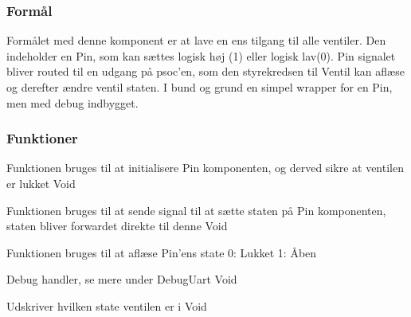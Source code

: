 \subsubsection{Formål}
Formålet med denne komponent er at lave en ens 
tilgang til alle ventiler. Den indeholder en Pin, 
som kan sættes logisk høj (1) eller logisk lav(0). 
Pin signalet bliver routed til en udgang på psoc'en, 
som den styrekredsen til Ventil kan aflæse og derefter 
ændre ventil staten. I bund og grund en simpel wrapper 
for en Pin, men med debug indbygget.

\subsubsection{Funktioner}

{Funktionen bruges til at initialisere Pin komponenten, og derved sikre at ventilen er lukket}
{Void}
{}

{Funktionen bruges til at sende signal til at sætte staten på Pin komponenten, staten bliver forwardet direkte til denne}
{Void}
{
}

{Funktionen bruges til at aflæse Pin'ens state}
{0: Lukket 1: Åben}
{}

{Debug handler, se mere under DebugUart}
{Void}
{
}

{Udskriver hvilken state ventilen er i}
{Void}
{}